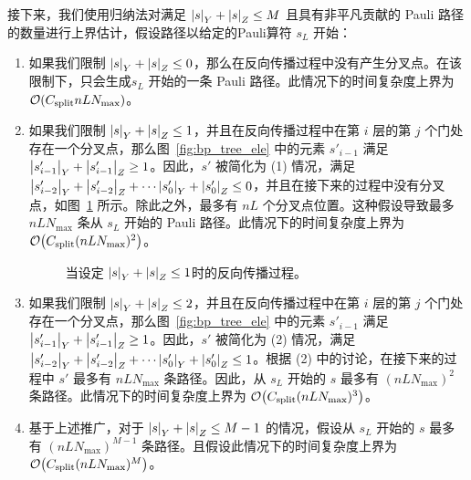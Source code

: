 接下来，我们使用归纳法对满足 $\abs{s}_Y+\abs{s}_Z\leq M$ 且具有非平凡贡献的 Pauli 路径的数量进行上界估计，假设路径以给定的Pauli算符 $s_L$ 开始：
\begin{enumerate}
    \item 如果我们限制 $\abs{s}_Y+\abs{s}_Z\leq 0$，那么在反向传播过程中没有产生分叉点。在该限制下，只会生成$s_L$ 开始的一条 Pauli 路径。此情况下的时间复杂度上界为 $\order{C_{\text{split}}nLN_{\text{max}}}$。
    \item 如果我们限制 $\abs{s}_Y+\abs{s}_Z\leq 1$，并且在反向传播过程中在第 $i$ 层的第 $j$ 个门处存在一个分叉点，那么图~\ref{fig:bp_tree_ele} 中的元素 $s'_{i-1}$ 满足 $\abs{s'_{i-1}}_Y+\abs{s'_{i-1}}_Z\geq 1$。因此，$s'$ 被简化为 (1) 情况，满足 $\abs{s'_{i-2}}_Y+\abs{s'_{i-2}}_Z+\cdots \abs{s'_{0}}_Y+\abs{s'_{0}}_Z \leq 0$，并且在接下来的过程中没有分叉点，如图~\ref{fig:bp_tree_ele:2} 所示。除此之外，最多有 $nL$ 个分叉点位置。这种假设导致最多 $nLN_{\text{max}}$ 条从 $s_L$ 开始的 Pauli 路径。此情况下的时间复杂度上界为 $\order{C_{\text{split}}(nLN_{\text{max}})^2}$。
    

    \begin{figure}[htbp]
        \centering
        \caption{当设定 $\abs{s}_Y+\abs{s}_Z\leq 1$时的反向传播过程。}\label{fig:bp_tree_ele:2}
    \end{figure}

    \item 如果我们限制 $\abs{s}_Y+\abs{s}_Z\leq 2$，并且在反向传播过程中在第 $i$ 层的第 $j$ 个门处存在一个分叉点，那么图~\ref{fig:bp_tree_ele} 中的元素 $s'_{i-1}$ 满足 $\abs{s'_{i-1}}_Y+\abs{s'_{i-1}}_Z\geq 1$。因此，$s'$ 被简化为 (2) 情况，满足 $\abs{s'_{i-2}}_Y+\abs{s'_{i-2}}_Z+\cdots \abs{s'_{0}}_Y+\abs{s'_{0}}_Z \leq 1$。根据 (2) 中的讨论，在接下来的过程中 $s'$ 最多有 $nLN_{\text{max}}$ 条路径。因此，从 $s_L$ 开始的 $s$ 最多有 $(nLN_{\text{max}})^2$ 条路径。此情况下的时间复杂度上界为 $\order{C_{\text{split}}(nLN_{\text{max}})^3}$。
    \item 基于上述推广，对于 $\abs{s}_Y+\abs{s}_Z\leq M-1$ 的情况，假设从 $s_L$ 开始的 $s$ 最多有 $(nLN_{\text{max}})^{M-1}$ 条路径。且假设此情况下的时间复杂度上界为 $\order{C_{\text{split}}(nLN_{\text{max}})^M}$。
    


\end{enumerate}
